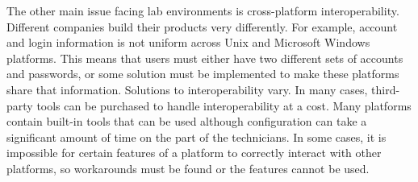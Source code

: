 The other main issue facing lab environments is cross-platform interoperability.  Different companies build their products very differently.  For example, account and login information is not uniform across Unix and Microsoft Windows platforms.  This means that users must either have two different sets of accounts and passwords, or some solution must be implemented to make these platforms share that information.   Solutions to interoperability vary.  In many cases, third-party tools can be purchased to handle interoperability at a cost.  Many platforms contain built-in tools that can be used although configuration can take a significant amount of time on the part of the technicians.  In some cases, it is impossible for certain features of a platform to correctly interact with other platforms, so workarounds must be found or the features cannot be used. 





